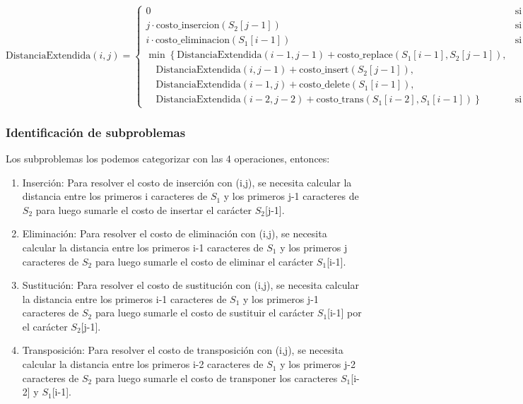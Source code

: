 \[  
\text{DistanciaExtendida}(i, j) = 
\begin{cases}
0 & \text{si } i = 0 \text{ y } j = 0, \\
j \cdot \text{costo\_insercion}(S_2[j-1]) & \text{si } i = 0, \\
i \cdot \text{costo\_eliminacion}(S_1[i-1]) & \text{si } j = 0, \\
\min\left\{
\text{DistanciaExtendida}(i-1, j-1) + \text{costo\_replace}(S_1[i-1], S_2[j-1]), \right. \\
\quad \left. \text{DistanciaExtendida}(i, j-1) + \text{costo\_insert}(S_2[j-1]), \right. \\
\quad \left. \text{DistanciaExtendida}(i-1, j) + \text{costo\_delete}(S_1[i-1]), \right. \\
\quad \left. \text{DistanciaExtendida}(i-2, j-2) + \text{costo\_trans}(S_1[i-2], S_1[i-1]) \right\} 
& \text{si } i > 0 \text{ y } j > 0.
\end{cases}
\]

\subsubsection{Identificación de subproblemas}

Los subproblemas los podemos categorizar con las 4 operaciones, entonces:

\begin{enumerate}
    \item Inserción: Para resolver el costo de inserción con (i,j), se necesita
    calcular la distancia entre los primeros i caracteres de $S_1$ y los primeros
    j-1 caracteres de $S_2$ para luego sumarle el costo de insertar el carácter
    $S_2$[j-1].
    \item Eliminación: Para resolver el costo de eliminación con (i,j), se necesita
    calcular la distancia entre los primeros i-1 caracteres de $S_1$ y los primeros
    j caracteres de $S_2$ para luego sumarle el costo de eliminar el carácter
    $S_1$[i-1].
    \item Sustitución: Para resolver el costo de sustitución con (i,j), se necesita
    calcular la distancia entre los primeros i-1 caracteres de $S_1$ y los primeros
    j-1 caracteres de $S_2$ para luego sumarle el costo de sustituir el carácter
    $S_1$[i-1] por el carácter $S_2$[j-1].
    \item Transposición: Para resolver el costo de transposición con (i,j), se necesita
    calcular la distancia entre los primeros i-2 caracteres de $S_1$ y los primeros
    j-2 caracteres de $S_2$ para luego sumarle el costo de transponer los caracteres
    $S_1$[i-2] y $S_1$[i-1].

\end{enumerate}

